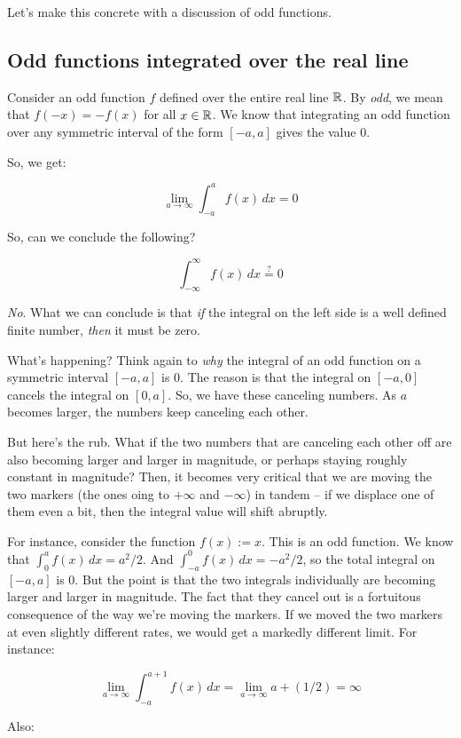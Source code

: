 \documentclass[10pt]{amsart}
\begin{document}
Let's make this concrete with a discussion of odd functions.

\subsection{Odd functions integrated over the real line}

Consider an odd function $f$ defined over the entire real line
$\mathbb{R}$. By {\em odd}, we mean that $f(-x) = -f(x)$ for all $x \in
\mathbb{R}$. We know that integrating an odd function over any symmetric
interval of the form $[-a,a]$ gives the value $0$.

So, we get:

$$\lim_{a \to \infty} \int_{-a}^a f(x) \, dx = 0$$

So, can we conclude the following?

$$\int_{-\infty}^\infty f(x) \, dx \stackrel{?}{=} 0$$

{\em No}. What we can conclude is that {\em if} the integral on the
left side is a well defined finite number, {\em then} it must be zero.

What's happening? Think again to {\em why} the integral of an odd
function on a symmetric interval $[-a,a]$ is $0$. The reason is that
the integral on $[-a,0]$ cancels the integral on $[0,a]$. So, we have
these canceling numbers. As $a$ becomes larger, the numbers keep
canceling each other.

But here's the rub. What if the two numbers that are canceling each
other off are also becoming larger and larger in magnitude, or perhaps
staying roughly constant in magnitude? Then, it becomes very critical
that we are moving the two markers (the ones oing to $+\infty$ and
$-\infty$) in tandem -- if we displace one of them even a bit, then
the integral value will shift abruptly.

For instance, consider the function $f(x) := x$. This is an odd
function. We know that $\int_0^a f(x) \, dx = a^2/2$. And $\int_{-a}^0
f(x) \, dx = -a^2/2$, so the total integral on $[-a,a]$ is $0$. But
the point is that the two integrals individually are becoming larger
and larger in magnitude. The fact that they cancel out is a fortuitous
consequence of the way we're moving the markers. If we moved the two
markers at even slightly different rates, we would get a markedly
different limit. For instance:

$$\lim_{a \to \infty} \int_{-a}^{a + 1} f(x) \, dx = \lim_{a \to \infty} a + (1/2) = \infty$$

Also:
\end{document}
